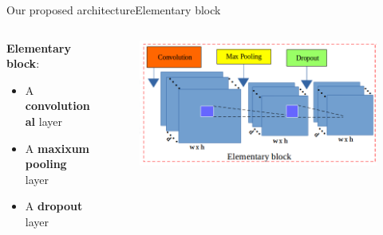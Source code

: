 \documentclass[10pt,svgnames]{beamer}
\begin{document}
\begin{frame}{Our proposed architecture}{Elementary block}
  \begin{columns}
		\begin{column}{0.45\textwidth}	
			
			\textbf{\color{elem}Elementary block}: 
			\small{
			\begin{itemize}
				\item A \textbf{\color{conv}convolutional} layer
    			\item A \textbf{\color{pool}maxixum pooling} layer
    			\item A \textbf{\color{drop}dropout} layer
  			\end{itemize}  			
  			}			 			
		\end{column}
		\begin{column}{0.55\textwidth}  %
			\begin{center}
     			\begin{figure}[htbp]
        			\centering
        			\includegraphics[scale=.28]{images/elementary_block}
    				\label{figrsexample1}
				\end{figure}
     		\end{center}	     					     		
		\end{column}
	\end{columns}~\\		
		
\end{frame}
\end{document}
